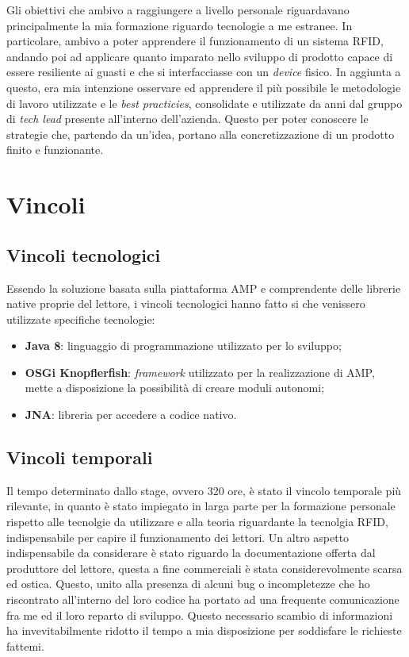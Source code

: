 Gli obiettivi che ambivo a raggiungere a livello personale riguardavano principalmente la mia formazione riguardo tecnologie a me estranee. 
In particolare, ambivo a poter apprendere il funzionamento di un sistema RFID, andando poi ad applicare quanto imparato nello sviluppo di prodotto 
capace di essere resiliente ai guasti e che si interfacciasse con un \emph{device} fisico.
In aggiunta a questo, era mia intenzione osservare ed apprendere il più possibile le metodologie di lavoro utilizzate e le \emph{best practicies}, consolidate
e utilizzate da anni dal gruppo di \emph{tech lead} presente all'interno dell'azienda. Questo per poter conoscere le strategie che, partendo da un'idea,
portano alla concretizzazione di un prodotto finito e funzionante.
\section{Vincoli}
\subsection{Vincoli tecnologici}
Essendo la soluzione basata sulla piattaforma AMP e comprendente delle librerie native proprie del lettore, i vincoli tecnologici hanno fatto si che venissero utilizzate specifiche tecnologie:
\begin{itemize}
    \item \textbf{Java 8}: linguaggio di programmazione utilizzato per lo sviluppo;
    \item \textbf{OSGi Knopflerfish}: \emph{framework} utilizzato per la realizzazione di AMP, mette a disposizione la possibilità di creare moduli autonomi;
    \item \textbf{JNA}: libreria per accedere a codice nativo.
\end{itemize}

\subsection{Vincoli temporali}
Il tempo determinato dallo stage, ovvero 320 ore, è stato il vincolo temporale più rilevante, in quanto è stato impiegato in larga parte per la formazione personale rispetto alle tecnolgie da utilizzare
e alla teoria riguardante la tecnolgia RFID, indispensabile per capire il funzionamento dei lettori.
Un altro aspetto indispensabile da considerare è stato riguardo la documentazione offerta dal produttore del lettore, questa a fine commerciali è stata considerevolmente scarsa ed ostica.
Questo, unito alla presenza di alcuni bug o incompletezze che ho riscontrato all'interno del loro codice ha portato ad una frequente comunicazione fra me ed il loro reparto di sviluppo.
Questo necessario scambio di informazioni ha invevitabilmente ridotto il tempo a mia disposizione per soddisfare le richieste fattemi.

